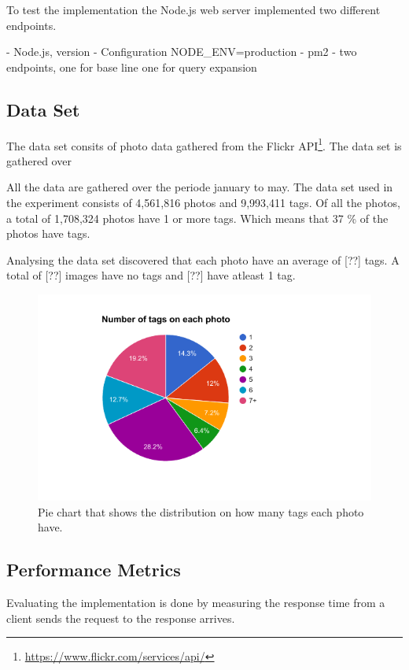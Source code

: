 To test the implementation the Node.js web server implemented two different endpoints.

- Node.js, version
- Configuration NODE\_ENV=production
- pm2
- two endpoints, one for base line one for query expansion

\subsection{Data Set}
\label{sec:dataset}
The data set consits of photo data gathered from the Flickr API\footnote{\url{https://www.flickr.com/services/api/}}.
The data set is gathered over

All the data are gathered over the periode january to may.
The data set used in the experiment consists of 4,561,816 photos and 9,993,411 tags.
Of all the photos, a total of 1,708,324 photos have 1 or more tags.
Which means that 37 \% of the photos have tags.

Analysing the data set discovered that each photo have an average of [??] tags.
A total of [??] images have no tags and [??] have atleast 1 tag.

\begin{figure}[h!]
  \centering \includegraphics[width=1\linewidth]{img/number-of-tags-distribution.png}
  \caption{Pie chart that shows the distribution on how many tags each photo have.}
  \label{fig:result-vary-result-size}
\end{figure}

\subsection{Performance Metrics}
Evaluating the implementation is done by measuring the response time from a client sends the request to the response arrives.


